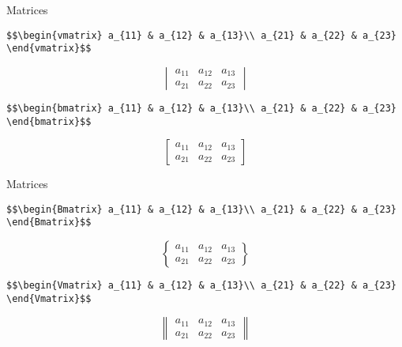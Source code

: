 \documentclass[
  ignorenonframetext,
]{beamer}
\begin{document}
\begin{frame}[fragile]{Matrices}
\protect\hypertarget{matrices-1}{}

\texttt{\$\$\textbackslash{}begin\{vmatrix\}\ a\_\{11\}\ \&\ a\_\{12\}\ \&\ a\_\{13\}\textbackslash{}\textbackslash{}\ a\_\{21\}\ \&\ a\_\{22\}\ \&\ a\_\{23\}\ \textbackslash{}end\{vmatrix\}\$\$}

\[\begin{vmatrix}
a_{11} & a_{12} & a_{13}\\
a_{21} & a_{22} & a_{23}
\end{vmatrix}\]

\texttt{\$\$\textbackslash{}begin\{bmatrix\}\ a\_\{11\}\ \&\ a\_\{12\}\ \&\ a\_\{13\}\textbackslash{}\textbackslash{}\ a\_\{21\}\ \&\ a\_\{22\}\ \&\ a\_\{23\}\ \textbackslash{}end\{bmatrix\}\$\$}

\[\begin{bmatrix}
a_{11} & a_{12} & a_{13}\\
a_{21} & a_{22} & a_{23}
\end{bmatrix}\]

\end{frame}

\begin{frame}[fragile]{Matrices}
\protect\hypertarget{matrices-2}{}

\texttt{\$\$\textbackslash{}begin\{Bmatrix\}\ a\_\{11\}\ \&\ a\_\{12\}\ \&\ a\_\{13\}\textbackslash{}\textbackslash{}\ a\_\{21\}\ \&\ a\_\{22\}\ \&\ a\_\{23\}\ \textbackslash{}end\{Bmatrix\}\$\$}

\[\begin{Bmatrix}
a_{11} & a_{12} & a_{13}\\
a_{21} & a_{22} & a_{23}
\end{Bmatrix}\]

\texttt{\$\$\textbackslash{}begin\{Vmatrix\}\ a\_\{11\}\ \&\ a\_\{12\}\ \&\ a\_\{13\}\textbackslash{}\textbackslash{}\ a\_\{21\}\ \&\ a\_\{22\}\ \&\ a\_\{23\}\ \textbackslash{}end\{Vmatrix\}\$\$}

\[\begin{Vmatrix}
a_{11} & a_{12} & a_{13}\\
a_{21} & a_{22} & a_{23}
\end{Vmatrix}\]

\end{frame}
\end{document}
